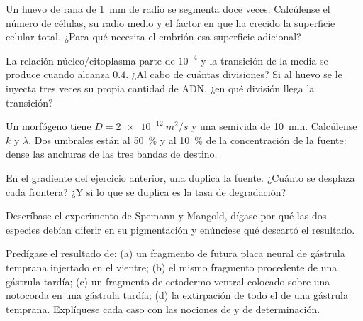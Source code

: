 \begin{exercise}[$\star\star$]\label{exo:b2:vertebrate-development:5}
Un huevo de rana de \qty{1}{mm} de radio se segmenta doce veces.
Calcúlense el número de células, su radio medio y el factor en que ha
crecido la superficie celular total. ¿Para qué necesita el embrión esa
superficie adicional?
\end{exercise}

\begin{exercise}[$\star\star$]\label{exo:b2:vertebrate-development:6}
La relación núcleo/citoplasma parte de $10^{-4}$ y la transición de la
 media se produce cuando alcanza $0.4$. ¿Al cabo de cuántas
divisiones? Si al huevo se le inyecta tres veces su propia cantidad de
ADN, ¿en qué división llega la transición?
\end{exercise}

\begin{exercise}[$\star\star$]\label{exo:b2:vertebrate-development:7}
Un morfógeno tiene $D = \qty{2e-12}{m^2/s}$ y una semivida de
\qty{10}{min}. Calcúlense $k$ y $\lambda$. Dos umbrales están al
\qty{50}{\%} y al \qty{10}{\%} de la concentración de la fuente: dense las
anchuras de las tres bandas de destino.
\end{exercise}

\begin{exercise}[$\star\star$]\label{exo:b2:vertebrate-development:8}
En el gradiente del ejercicio anterior, una  duplica la fuente.
¿Cuánto se desplaza cada frontera? ¿Y si lo que se duplica es la tasa de
degradación?
\end{exercise}

\begin{exercise}[$\star\star$]\label{exo:b2:vertebrate-development:9}
Descríbase el experimento de Spemann y Mangold, dígase por qué las dos
especies debían diferir en su pigmentación y enúnciese qué descartó el
resultado.
\end{exercise}

\begin{exercise}[$\star\star\star$]\label{exo:b2:vertebrate-development:10}
Predígase el resultado de: (a) un fragmento de futura placa neural de
gástrula temprana injertado en el vientre; (b) el mismo fragmento
procedente de una gástrula tardía; (c) un fragmento de ectodermo ventral
colocado sobre una notocorda en una gástrula tardía; (d) la extirpación
de todo el  de una gástrula temprana. Explíquese cada caso con
las nociones de  y de determinación.
\end{exercise}

